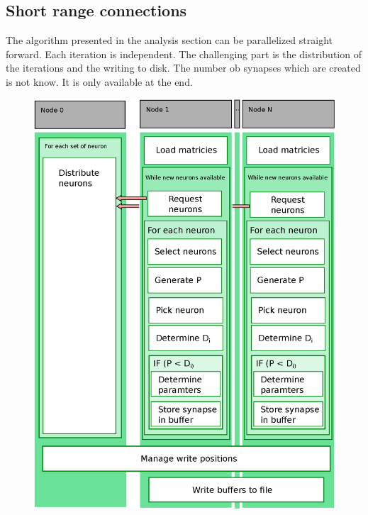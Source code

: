 \newpage
\subsection{Short range connections}

The algorithm presented in the analysis section can be parallelized straight forward.
Each iteration is independent. The challenging part is the distribution of the iterations and
the writing to disk. The number ob synapses which are created is not know. It is only available
at the end.

\begin{figure}[ht!]
\centering
\includegraphics[scale=0.5]{pictures/shortRange_parallelAlg.eps}
\end{figure}

